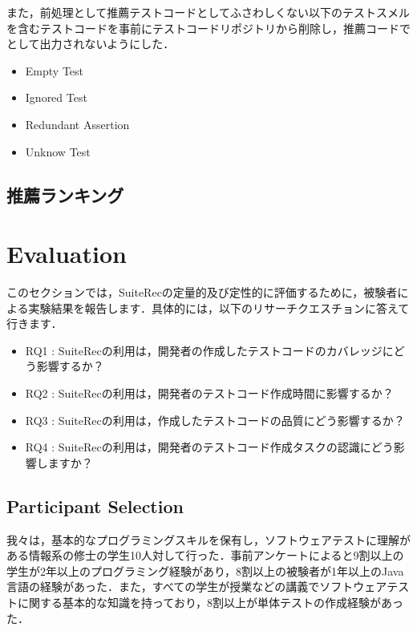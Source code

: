 \documentclass[conference]{IEEEtran}
\begin{document}
また，前処理として推薦テストコードとしてふさわしくない以下のテストスメルを含むテストコードを事前にテストコードリポジトリから削除し，推薦コードでとして出力されないようにした．

\begin{itemize}
\item Empty Test
\item Ignored Test
\item Redundant Assertion
\item Unknow Test
\end{itemize}

\subsection{推薦ランキング}

\section{Evaluation}

このセクションでは，SuiteRecの定量的及び定性的に評価するために，被験者による実験結果を報告します．具体的には，以下のリサーチクエスチョンに答えて行きます．

\begin{itemize}
\item RQ1 : SuiteRecの利用は，開発者の作成したテストコードのカバレッジにどう影響するか？
\item RQ2 : SuiteRecの利用は，開発者のテストコード作成時間に影響するか？
\item RQ3 : SuiteRecの利用は，作成したテストコードの品質にどう影響するか？
\item RQ4 : SuiteRecの利用は，開発者のテストコード作成タスクの認識にどう影響しますか？
\end{itemize}

\subsection{Participant Selection}
我々は，基本的なプログラミングスキルを保有し，ソフトウェアテストに理解がある情報系の修士の学生10人対して行った．事前アンケートによると9割以上の学生が2年以上のプログラミング経験があり，8割以上の被験者が1年以上のJava言語の経験があった．また，すべての学生が授業などの講義でソフトウェアテストに関する基本的な知識を持っており，8割以上が単体テストの作成経験があった．
\end{document}
